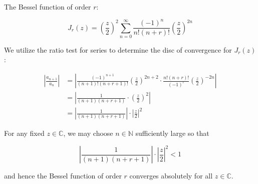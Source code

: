 The Bessel function of order $r$:

$$
J_r(z) = \left(\frac{z}{2}\right)^2 \sum\limits_{n=0}^{\infty}{\frac{(-1)^n}{n! (n + r)!}\left(\frac{z}{2}\right)^{2n}}
$$

\begin{solution}
    We utilize the ratio test for series to determine the disc of convergence for $J_r(z)$:

    \begin{align*}
        \left| \frac{a_{n+1}}{a_n} \right| &= \left| \frac{(-1)^{n+1}}{(n+1)! (n + r + 1)!} \left( \frac{z}{2} \right)^{2n + 2} \cdot \frac{n!(n + r)!}{(-1)^r} \left( \frac{z}{2} \right)^{-2n} \right| \\
                                           &= \left| \frac{1}{(n + 1)(n + r + 1)} \cdot \left( \frac{z}{2} \right)^{2} \right| \\
                                           &= \left| \frac{1}{(n + 1)(n + r + 1)} \right| \cdot \left| \frac{z}{2} \right|^{2}
    \end{align*}

    For any fixed $z \in \mathbb{C}$, we may choose $n \in \mathbb{N}$ sufficiently large so that

    $$
    \left| \frac{1}{(n + 1)(n + r + 1)} \right| \cdot \left| \frac{z}{2} \right|^{2} < 1
    $$

    and hence the Bessel function of order $r$ converges absolutely for all $z \in \mathbb{C}$.
    \ \\
\end{solution}
